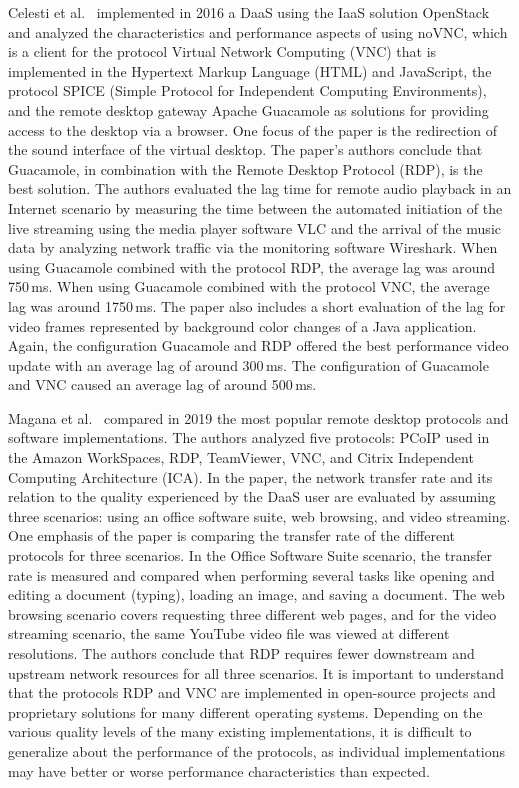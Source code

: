 \documentclass[runningheads]{llncs}
\begin{document}
Celesti et al.~\cite{celesti2016improving} implemented in 2016 a DaaS using the IaaS solution OpenStack~\cite{sefraoui2012openstack} and analyzed the characteristics and performance aspects of using noVNC, which is a client for the protocol Virtual Network Computing (VNC) that is implemented in the Hypertext Markup Language (HTML) and JavaScript, the protocol SPICE (Simple Protocol for Independent Computing Environments), and the remote desktop gateway Apache Guacamole as solutions for providing access to the desktop via a browser. One focus of the paper is the redirection of the sound interface of the virtual desktop. The paper's authors conclude that Guacamole, in combination with the Remote Desktop Protocol (RDP), is the best solution. The authors evaluated the lag time for remote audio playback in an Internet scenario by measuring the time between the automated initiation of the live streaming using the media player software VLC and the arrival of the music data by analyzing network traffic via the monitoring software Wireshark. When using Guacamole combined with the protocol RDP, the average lag was around 750\,ms. When using Guacamole combined with the protocol VNC, the average lag was around 1750\,ms. The paper also includes a short evaluation of the lag for video frames represented by background color changes of a Java application. Again, the configuration Guacamole and RDP offered the best performance video update with an average lag of around 300\,ms. The configuration of Guacamole and VNC caused an average lag of around 500\,ms.

Magana et al.~\cite{magana2019remote} compared in 2019 the most popular remote desktop protocols and software implementations. The authors analyzed five protocols: PCoIP used in the Amazon WorkSpaces, RDP, TeamViewer, VNC, and Citrix Independent Computing Architecture (ICA). In the paper, the network transfer rate and its relation to the quality experienced by the DaaS user are evaluated by assuming three scenarios: using an office software suite, web browsing, and video streaming. One emphasis of the paper is comparing the transfer rate of the different protocols for three scenarios. In the Office Software Suite scenario, the transfer rate is measured and compared when performing several tasks like opening and editing a document (typing), loading an image, and saving a document. The web browsing scenario covers requesting three different web pages, and for the video streaming scenario, the same YouTube video file was viewed at different resolutions. The authors conclude that RDP requires fewer downstream and upstream network resources for all three scenarios. It is important to understand that the protocols RDP and VNC are implemented in open-source projects and proprietary solutions for many different operating systems. Depending on the various quality levels of the many existing implementations, it is difficult to generalize about the performance of the protocols, as individual implementations may have better or worse performance characteristics than expected.
\end{document}
